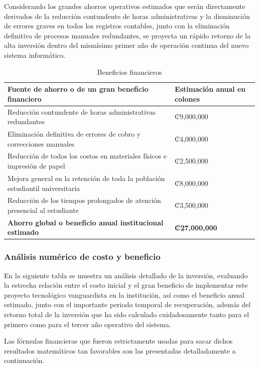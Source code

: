 \documentclass[11pt,spanish]{article}
\begin{document}
Considerando los grandes ahorros operativos estimados que serán directamente derivados de la reducción contundente de horas administrativas y la disminución de errores graves en todos los registros contables, junto con la eliminación definitiva de procesos manuales redundantes, se proyecta un rápido retorno de la alta inversión dentro del mismísimo primer año de operación continua del nuevo sistema informático.

\begin{table}[H]
\centering
\small
\caption{Beneficios financieros}\label{tab:beneficios-financieros}
\begin{tabularx}{\textwidth}{Y R{5cm}}
\toprule
\textbf{Fuente de ahorro o de un gran beneficio financiero} & \textbf{Estimación anual en colones} \\
\midrule
Reducción contundente de horas administrativas redundantes & ₡9,000,000 \\
Eliminación definitiva de errores de cobro y correcciones manuales & ₡4,000,000 \\
Reducción de todos los costos en materiales físicos e impresión de papel & ₡2,500,000 \\
Mejora general en la retención de toda la población estudiantil universitaria & ₡8,000,000 \\
Reducción de los tiempos prolongados de atención presencial al estudiante & ₡3,500,000 \\
\midrule
\textbf{Ahorro global o beneficio anual institucional estimado} & \textbf{₡27,000,000} \\
\bottomrule
\end{tabularx}
\end{table}

\subsubsection{Análisis numérico de costo y beneficio}

En la siguiente tabla se muestra un análisis detallado de la inversión, evaluando la estrecha relación entre el costo inicial y el gran beneficio de implementar este proyecto tecnológico vanguardista en la institución, así como el beneficio anual estimado, junto con el importante periodo temporal de recuperación, además del retorno total de la inversión que ha sido calculado cuidadosamente tanto para el primero como para el tercer año operativo del sistema.

Las fórmulas financieras que fueron estrictamente usadas para sacar dichos resultados matemáticos tan favorables son las presentadas detalladamente a continuación.
\end{document}

